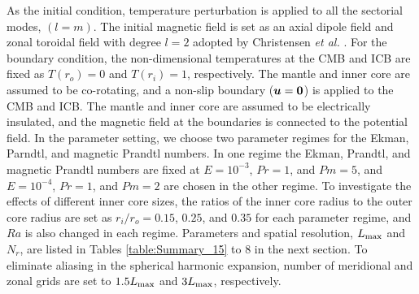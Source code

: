 As the initial condition, temperature perturbation is applied to all the sectorial modes, $(l = m)$. 
The initial magnetic field is set as an axial dipole field and zonal toroidal field with degree $l=2$ adopted by Christensen {\it et al.} . 
For the boundary condition, the non-dimensional temperatures at the CMB and ICB are fixed as $T(r_{o}) = 0$ and  $T(r_{i}) = 1$, respectively. 
The mantle and inner core are assumed to be co-rotating, and a non-slip boundary ($\mbox{\boldmath$u$} = \mbox{\boldmath$0$}$) is applied to the CMB and ICB. 
The mantle and inner core are assumed to be electrically insulated, and the magnetic field at the boundaries is connected to the potential field.
In the parameter setting, 
{\color{blue}
we choose two parameter regimes for the Ekman, Parndtl, and magnetic Prandtl numbers. In one regime the Ekman, Prandtl, and magnetic Prandtl numbers are fixed at $E = 10^{-3}$, $Pr = 1$, and $Pm = 5$, and  $E = 10^{-4}$, $Pr = 1$, and $Pm = 2$ are chosen in the other regime. To investigate the effects of different inner core sizes, the ratios of the inner core radius to the outer core radius are set as $r_{i} / r_{o} = 0.15$, $0.25$, and $0.35$ for each parameter regime, and $Ra$ is also changed in each regime. Parameters and spatial resolution, $L_{\rm max}$ and $N_{r}$, are listed in Tables \ref{table:Summary_15} to 8 
in the next section. To eliminate aliasing in the spherical harmonic expansion, number of meridional and zonal grids are set to $1.5 L_{\rm max}$ and $3 L_{\rm max}$, respectively.
}
